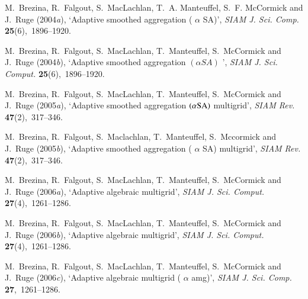 \documentclass[12pt]{acta_2011xz}
\begin{document}
\begin{thebibliography}{xx}
M.~Brezina, R.~Falgout, S.~MacLachlan, T.~A. Manteuffel, S.~F. McCormick and
  J.~Ruge  (2004{\em a}), `Adaptive smoothed aggregation (        $\alpha$        {SA})', {\em
  SIAM J. Sci. Comp.} {\bf 25}(6),~1896--1920.

M.~Brezina, R.~Falgout, S.~MacLachlan, T.~Manteuffel, S.~McCormick and J.~Ruge
  (2004{\em b}), `Adaptive smoothed aggregation {        $(\alpha SA)$        }', {\em SIAM J.
  Sci. Comput.} {\bf 25}(6),~1896--1920.

M.~Brezina, R.~Falgout, S.~MacLachlan, T.~Manteuffel, S.~McCormick and J.~Ruge
  (2005{\em a}), `Adaptive smoothed aggregation {        $(\alpha{\rm SA})$        }
  multigrid', {\em SIAM Rev.} {\bf 47}(2),~317--346.

M.~Brezina, R.~Falgout, S.~Maclachlan, T.~Manteuffel, S.~Mccormick and J.~Ruge
  (2005{\em b}), `Adaptive smoothed aggregation (        $\alpha$        {SA}) multigrid', {\em
  SIAM Rev.} {\bf 47}(2),~317--346.

M.~Brezina, R.~Falgout, S.~MacLachlan, T.~Manteuffel, S.~McCormick and J.~Ruge
  (2006{\em a}), `Adaptive algebraic multigrid', {\em SIAM J. Sci. Comput.}
  {\bf 27}(4),~1261--1286.

M.~Brezina, R.~Falgout, S.~MacLachlan, T.~Manteuffel, S.~McCormick and J.~Ruge
  (2006{\em b}), `Adaptive algebraic multigrid', {\em SIAM J. Sci. Comput.}
  {\bf 27}(4),~1261--1286.

M.~Brezina, R.~Falgout, S.~MacLachlan, T.~Manteuffel, S.~McCormick and J.~Ruge
  (2006{\em c}), `Adaptive algebraic multigrid (        $\alpha$        amg)', {\em SIAM J.
  Sci. Comp.} {\bf 27},~1261--1286.


\end{thebibliography}
\end{document}
